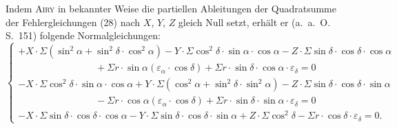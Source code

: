 \documentclass[12pt,a4paper]{article}
\theoremstyle{plain}
\theoremstyle{definition}
\theoremstyle{remark}
\begin{document}
\begin{small}
Indem \textsc{Airy} in bekannter Weise die partiellen Ableitungen der Quadratsumme
der Fehlergleichungen (28) nach $X$, $Y$, $Z$ gleich Null setzt, erh\"alt er (a.~a.~O.
S.~151) folgende Normalgleichungen:
\begin{equation}\tag{29}
\left\{\begin{array}{l}
+X\cdot\Sigma(\sin^{2}\alpha + \sin^{2}\delta\cdot\cos^{2}\alpha)
-Y\cdot\Sigma\cos^{2}\delta\cdot\sin\alpha\cdot\cos\alpha
-Z\cdot\Sigma\sin\delta\cdot\cos\delta\cdot\cos\alpha\\
\qquad\qquad\qquad\qquad
+\Sigma r\cdot\sin\alpha(\varepsilon_{\alpha}\cdot\cos\delta)
+\Sigma r\cdot\sin\delta\cdot\cos\alpha\cdot\varepsilon_{\delta} = 0\\
-X\cdot\Sigma\cos^{2}\delta\cdot\sin\alpha\cdot\cos\alpha
+Y\cdot\Sigma(\cos^{2}\alpha + \sin^{2}\delta\cdot\sin^{2}\alpha)
-Z\cdot\Sigma\sin\delta\cdot\cos\delta\cdot\sin\alpha\\
\qquad\qquad\qquad\qquad
-\Sigma r\cdot\cos\alpha(\varepsilon_{\alpha}\cdot\cos\delta)
+\Sigma r\cdot\sin\delta\cdot\sin\alpha\cdot\varepsilon_{\delta} = 0\\
-X\cdot\Sigma\sin\delta\cdot\cos\delta\cdot\cos\alpha
-Y\cdot\Sigma\sin\delta\cdot\cos\delta\cdot\sin\alpha
+Z\cdot\Sigma\cos^{2}\delta
-\Sigma r\cdot\cos\delta\cdot\varepsilon_{\delta} = 0.
\end{array}\right.\end{equation}
\end{small}
\end{document}
